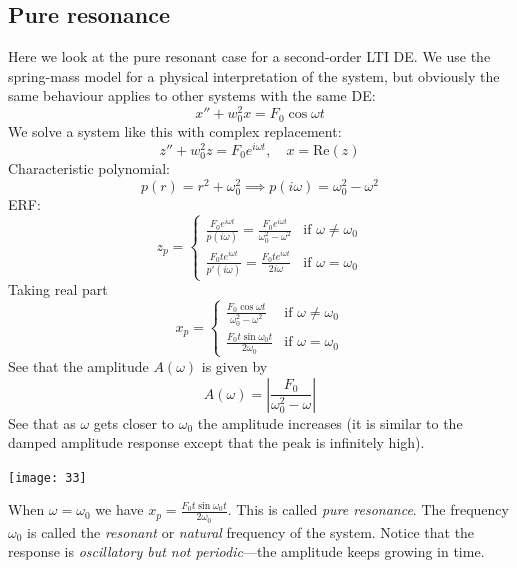 \documentclass{report}
\begin{document}
\subsection{Pure resonance}
Here we look at the pure resonant case for a second-order LTI DE. We use the spring-mass model for a physical
interpretation of the system, but obviously the same behaviour applies to other systems with the same DE:
\begin{equation*}
x''+w_0^2x=F_0\cos\omega t
\end{equation*}
We solve a system like this with complex replacement:
\begin{equation*}
z''+w_0^2z=F_0e^{i\omega t},\quad x=\text{Re}(z)
\end{equation*}
Characteristic polynomial:
\begin{equation*}
p(r)=r^2+\omega_0^2\implies p(i\omega)=\omega_0^2-\omega^2
\end{equation*}
ERF:
\begin{equation*}
z_p=\begin{cases}
\frac{F_0e^{i\omega t}}{p(i\omega)}=\frac{F_0e^{i\omega t}}{\omega_0^2-\omega^2}&\text{if $\omega\neq\omega_0$}
\\
\frac{F_0te^{i\omega t}}{p'(i\omega)}=\frac{F_0te^{i\omega t}}{2i\omega}&\text{if $\omega=\omega_0$}
\end{cases}
\end{equation*}
Taking real part
\begin{equation*}
x_p=\begin{cases}
\frac{F_0\cos\omega t}{\omega_0^2-\omega^2}&\text{if $\omega\neq\omega_0$}\\
\frac{F_0t\sin\omega_0t}{2\omega_0}&\text{if $\omega=\omega_0$}
\end{cases}
\end{equation*}
See that the amplitude $A(\omega)$ is given by
\begin{equation*}
A(\omega)=\left|\frac{F_0}{\omega_0^2-\omega}\right|
\end{equation*}
See that as $\omega$ gets closer to $\omega_0$ the amplitude increases (it is similar to the damped amplitude
response except that the peak is infinitely high). 
\begin{center}
\texttt{[image: 33]}\\
\end{center}
When $\omega=\omega_0$ we have $x_p=\frac{F_0t\sin\omega_0t}{2\omega_0}$. This is called \textit{pure resonance}.
The frequency $\omega_0$ is called the \textit{resonant} or \textit{natural} frequency of the system.
Notice that the response is \textit{oscillatory but not periodic}---the amplitude keeps growing in time.
\newpage
\end{document}
